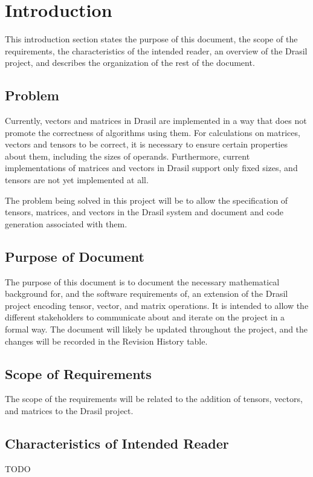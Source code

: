 \documentclass[12pt]{article}
\begin{document}

\section{Introduction}
This introduction section states the purpose of this document, the scope of 
the requirements, the characteristics of the intended reader, an overview of the
Drasil project, and describes the organization of the rest of the document.

\subsection{Problem}
Currently, vectors and matrices in Drasil are implemented in a way that does not 
promote the correctness of algorithms using them. For calculations on matrices,
vectors and tensors to be correct, it is necessary to ensure certain properties
about them, including the sizes of operands. Furthermore, current implementations
of matrices and vectors in Drasil support only fixed sizes, and tensors are not
yet implemented at all.

The problem being solved in this project will be to allow the specification of
tensors, matrices, and vectors in the Drasil system and document and code generation 
associated with them.

\subsection{Purpose of Document}
The purpose of this document is to document the necessary mathematical background for,
and the software requirements of, an extension of the Drasil project encoding tensor,
vector, and matrix operations. It is intended to allow the different stakeholders to
communicate about and iterate on the project in a formal way. The document will likely
be updated throughout the project, and the changes will be recorded in the Revision
History table.

\subsection{Scope of Requirements} 
The scope of the requirements will be related to the addition of tensors, vectors,
and matrices to the Drasil project.

\subsection{Characteristics of Intended Reader}\label{sec_IntendedReader}
TODO
\end{document}
